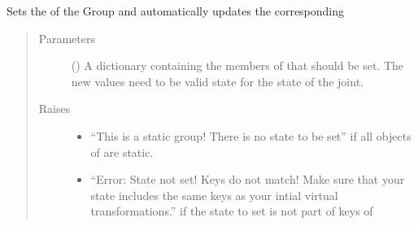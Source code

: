 \documentclass[letterpaper,10pt,english]{sphinxmanual}
\begin{document}
\begin{fulllineitems}
\begin{fulllineitems}
\label{\detokenize{code_docu:trip_kinematics.KinematicGroup.KinematicGroup.set_virtual_state}}
Sets the  of the Group and automatically updates the corresponding 
\begin{quote}\begin{description}
\item[{Parameters}] \leavevmode
{} (\sphinxstyleliteralemphasis{\sphinxupquote{{[}}}\sphinxstyleliteralemphasis{\sphinxupquote{,}}\sphinxstyleliteralemphasis{\sphinxupquote{{[}}}\sphinxstyleliteralemphasis{\sphinxupquote{, }}\sphinxstyleliteralemphasis{\sphinxupquote{{]}}}\sphinxstyleliteralemphasis{\sphinxupquote{{]}}}) \textendash{} A dictionary containing the members of  that should be set.
The new values need to be valid state for the state of the joint.

\item[{Raises}] \leavevmode\begin{itemize}
\item {} 
 \textendash{} “This is a static group! There is no state to be set” if all  {\hyperref[\detokenize{code_docu:trip_kinematics.KinematicGroup.Transformation}]{}} objects of  are static.

\item {} 
 \textendash{} “Error: State not set! Keys do not match! Make sure that your state includes the same keys as your intial virtual transformations.”
    if the state to set is not part of keys of 

\end{itemize}

\end{description}\end{quote}

\end{fulllineitems}


\end{fulllineitems}
\end{document}
